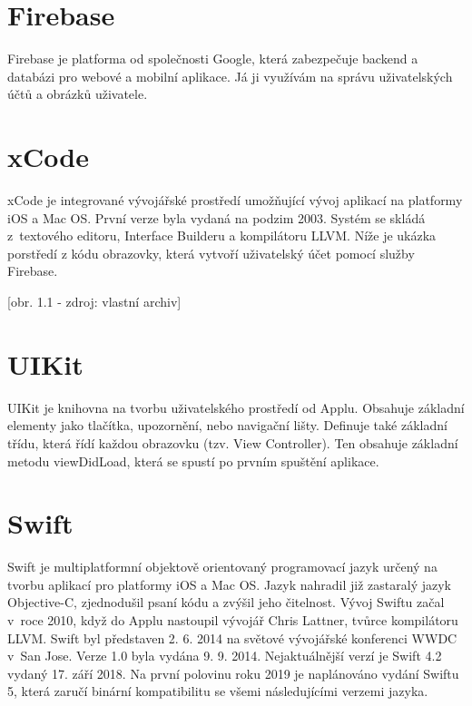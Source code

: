 \documentclass{article}
\begin{document}
\vspace{10 mm}

\section{Firebase}
	Firebase je platforma od společnosti Google, která zabezpečuje backend a databázi pro webové a mobilní aplikace. Já ji využívám na správu uživatelských účtů a obrázků uživatele.



\vspace{10 mm}

\section{xCode}
xCode je integrované vývojářské prostředí umožňující vývoj aplikací na platformy iOS a Mac OS. První verze byla vydaná na podzim 2003. Systém se skládá z textového 
editoru, Interface Builderu a kompilátoru LLVM. Níže je ukázka porstředí z kódu obrazovky, která vytvoří uživatelský účet pomocí služby Firebase.

[obr. 1.1 - zdroj: vlastní archiv]
\vspace{10 mm}
\section{UIKit}
UIKit je knihovna na tvorbu uživatelského prostředí od Applu. Obsahuje základní elementy jako tlačítka, upozornění, nebo navigační lišty. Definuje také základní třídu, která řídí každou obrazovku (tzv. View Controller). Ten obsahuje základní metodu viewDidLoad, která se spustí po prvním spuštění aplikace.




\section{Swift}
Swift je multiplatformní objektově orientovaný programovací jazyk určený na tvorbu aplikací pro platformy iOS a Mac OS. Jazyk nahradil již zastaralý jazyk Objective-C, zjednodušil psaní kódu a zvýšil jeho čitelnost. Vývoj Swiftu začal v roce 2010, když do Applu nastoupil vývojář Chris Lattner, tvůrce kompilátoru LLVM. 
Swift byl představen 2. 6. 2014 na světové vývojářské konferenci WWDC v San Jose. Verze 1.0 byla vydána 9. 9. 2014. Nejaktuálnější verzí je Swift 4.2 vydaný 17. září 2018. Na první polovinu roku 2019 je naplánováno vydání Swiftu 5, která zaručí binární kompatibilitu se všemi následujícími verzemi jazyka.
\vspace{10 mm}
\end{document}
